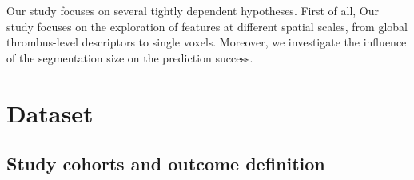 \documentclass[preprint,12pt]{elsarticle}
\begin{document}
Our study focuses on several tightly dependent hypotheses. First of all, 
Our study focuses on the exploration of features at different spatial scales, from global thrombus-level descriptors to single voxels. Moreover, we investigate the influence of the segmentation size on the prediction success.









\section{Dataset}
\subsection{Study cohorts and outcome definition}
\end{document}
